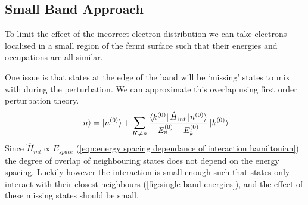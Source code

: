 \subsection{Small Band Approach}\label{sec:small band approach}
To limit the effect of the incorrect
electron distribution we can
take electrons localised
in a small region of the fermi
surface such that their energies
and occupations are all similar.

One issue is that states at the edge
of the band will be `missing'
states to mix with during the
perturbation. We can approximate
this overlap using first order perturbation theory.
\begin{equation}
    \ket{n} = \ket{n^{(0)}} + \sum_{K\neq{}n} \frac{\bra{k^{(0)}} \hat{H}_{int} \ket{n^{(0)}}}{E_n^{(0)} - E_k^{(0)}} \ket{k^{(0)}}
\end{equation}
Since \(\hat{H}_{int} \propto E_{space}\)
(\cref{eqn:energy spacing dependance of interaction hamiltonian})
the degree of overlap of neighbouring states does
not depend on the energy spacing. Luckily
however the interaction is small
enough such that states only interact with
their closest neighbours (\cref{fig:single band energies}),
and the effect of these missing states should be small.
